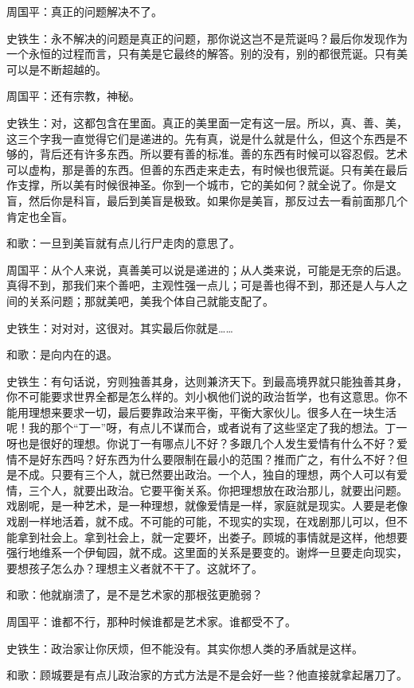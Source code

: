 \documentclass[fontset=fandol,12pt,a5paper]{ctexbook}
\begin{document}
周国平：真正的问题解决不了。

史铁生：永不解决的问题是真正的问题，那你说这岂不是荒诞吗？最后你发现作为一个永恒的过程而言，只有美是它最终的解答。别的没有，别的都很荒诞。只有美可以是不断超越的。

周国平：还有宗教，神秘。

史铁生：对，这都包含在里面。真正的美里面一定有这一层。所以，真、善、美，这三个字我一直觉得它们是递进的。先有真，说是什么就是什么，但这个东西是不够的，背后还有许多东西。所以要有善的标准。善的东西有时候可以容忍假。艺术可以虚构，那是善的东西。但善的东西走来走去，有时候也很荒诞。只有美在最后作支撑，所以美有时候很神圣。你到一个城市，它的美如何？就全说了。你是文盲，然后你是科盲，最后到美盲是极致。如果你是美盲，那反过去一看前面那几个肯定也全盲。

和歌：一旦到美盲就有点儿行尸走肉的意思了。

周国平：从个人来说，真善美可以说是递进的；从人类来说，可能是无奈的后退。真得不到，那我们来个善吧，主观性强一点儿；可是善也得不到，那还是人与人之间的关系问题；那就美吧，美我个体自己就能支配了。

史铁生：对对对，这很对。其实最后你就是……

和歌：是向内在的退。

史铁生：有句话说，穷则独善其身，达则兼济天下。到最高境界就只能独善其身，你不可能要求世界全都是怎么样的。刘小枫他们说的政治哲学，也有这意思。你不能用理想来要求一切，最后要靠政治来平衡，平衡大家伙儿。很多人在一块生活呢！我的那个“丁一”呀，有点儿不谋而合，或者说有了这些坚定了我的想法。丁一呀也是很好的理想。你说丁一有哪点儿不好？多跟几个人发生爱情有什么不好？爱情不是好东西吗？好东西为什么要限制在最小的范围？推而广之，有什么不好？但是不成。只要有三个人，就已然要出政治。一个人，独自的理想，两个人可以有爱情，三个人，就要出政治。它要平衡关系。你把理想放在政治那儿，就要出问题。戏剧呢，是一种艺术，是一种理想，就像爱情是一样，家庭就是现实。人要是老像戏剧一样地活着，就不成。不可能的可能，不现实的实现，在戏剧那儿可以，但不能拿到社会上。拿到社会上，就一定要坏，出娄子。顾城的事情就是这样，他想要强行地维系一个伊甸园，就不成。这里面的关系是要变的。谢烨一旦要走向现实，要想孩子怎么办？理想主义者就不干了。这就坏了。

和歌：他就崩溃了，是不是艺术家的那根弦更脆弱？

周国平：谁都不行，那种时候谁都是艺术家。谁都受不了。

史铁生：政治家让你厌烦，但不能没有。其实你想人类的矛盾就是这样。

和歌：顾城要是有点儿政治家的方式方法是不是会好一些？他直接就拿起屠刀了。
\end{document}
